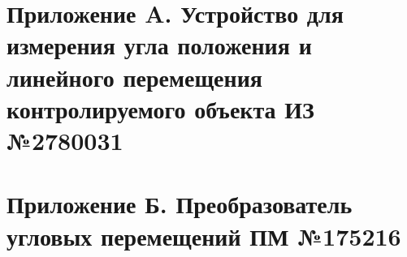 \newpage
\section{Приложение A. Устройство для измерения угла положения и линейного перемещения контролируемого объекта ИЗ №2780031}\label{sec:applicationA}
\begin{figure}[!h]
    \centering
    
    \label{fig:app2.1}
\end{figure}
\newpage
\begin{figure}[!h]
    \centering
    
    \label{fig:app2.2}
\end{figure}
\newpage

\begin{figure}[!h]
    \centering
    
    \label{fig:app2.3}
\end{figure}
\newpage

\begin{figure}[!h]
    \centering
    
    \label{fig:app2.4}
\end{figure}
\newpage

\begin{figure}[!h]
    \centering
    
    \label{fig:app2.5}
\end{figure}
\newpage

\begin{figure}[!h]
    \centering
    
    \label{fig:app2.6}
\end{figure}
\newpage

\section{Приложение Б. Преобразователь угловых перемещений ПМ №175216}\label{sec:applicationB}

\begin{figure}[!h]
    \centering
    
    \label{fig:app3.1}
\end{figure}
\newpage
\begin{figure}[!h]
    \centering
    
    \label{fig:app3.2}
\end{figure}
\newpage

\begin{figure}[!h]
    \centering
    
    \label{fig:app3.3}
\end{figure}
\newpage

